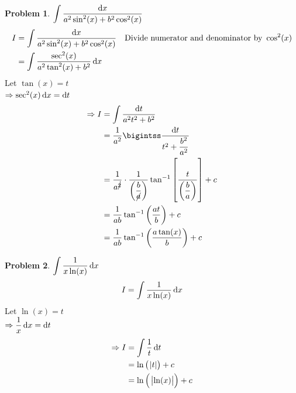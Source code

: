 \documentclass[14]{article}
\theoremstyle{definition}
\newtheorem{prob}{Problem}
\theoremstyle{case}
\begin{document}
\pagebreak
\begin{prob}
$\displaystyle \int \dfrac{\dif x}{a^2 \sin^2(x) + b^2 \cos^2(x)}$
\begin{align*}
I &= \int \dfrac{\dif x}{a^2 \sin^2(x) + b^2 \cos^2(x)} && \text{Divide numerator and denominator by } \cos^2(x)\\
&= \int \dfrac{\sec^2(x)}{a^2 \tan^2(x) + b^2}\dif x
\end{align*}
Let $\tan(x) = t$\\
$\Rightarrow \sec^2(x) \dif x = \dif t$
\begin{align*}
\Rightarrow I &= \int \dfrac{\dif t}{a^2 t^2 + b^2}\\
&= \dfrac1{a^2} \bigintss \dfrac{\dif t}{t^2 + \dfrac{b^2}{a^2}}\\
&= \dfrac1{a^{\cancel{2}}}\cdot \dfrac1{\left(\dfrac{b}{\cancel{a}}\right)} \tan^{-1}\left[\dfrac{t}{\left(\dfrac{b}{a}\right)}\right]+c\\
&=\dfrac1{ab} \tan^{-1} \left( \dfrac{at}{b} \right)+c\\
&=\dfrac1{ab} \tan^{-1} \left( \dfrac{a\tan(x)}{b} \right)+c
\end{align*}
\end{prob}
\begin{prob}
$\displaystyle \int \dfrac{1}{x\ln(x)}\dif x$
\[I = \int \dfrac1{x \ln(x)} \dif x\]
Let $\ln(x) = t$\\
$\Rightarrow \dfrac1{x} \dif x = \dif t$
\begin{align*}
\Rightarrow I &= \int \dfrac1{t} \dif t\\
&= \ln\left(\;\abs{t}\right) + c\\
&= \ln\left(\; \abs{\ln(x)} \right) + c
\end{align*}
\end{prob}
\pagebreak
\end{document}

